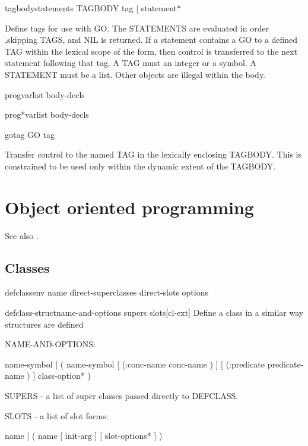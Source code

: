 \documentclass[10pt,english]{book}
\begin{document}
\begin{specialop}{tagbody}{\rest statements}
  TAGBODY {tag | statement}*

Define tags for use with GO. The STATEMENTS are evaluated in order ,skipping
TAGS, and NIL is returned. If a statement contains a GO to a defined TAG
within the lexical scope of the form, then control is transferred to the next
statement following that tag. A TAG must an integer or a symbol. A STATEMENT
must be a list. Other objects are illegal within the body.
\end{specialop}

\begin{macro}{prog}{varlist \body body-decls}
  
\end{macro}

\begin{macro}{prog*}{varlist \body body-decls}
  
\end{macro}

\begin{specialop}{go}{tag}
  GO tag

Transfer control to the named TAG in the lexically enclosing TAGBODY. This is
constrained to be used only within the dynamic extent of the TAGBODY.
\end{specialop}

\chapter{Object oriented programming}
\label{cha:object-orient-progr}

See also .

\section{Classes}
\label{sec:classes}

\begin{macro}{defclass}{\env env name direct-superclasses direct-slots \rest options}
  
\end{macro}

\begin{macro}{defclass-struct}{name-and-options supers \rest slots}[cl-ext]
  Define a class in a similar way structures are defined

NAME-AND-OPTIONS:

  name-symbol |
  ( name-symbol [ (:conc-name conc-name ) ]
                [ (:predicate predicate-name ) ]
                class-option* )

SUPERS - a list of super classes passed directly to DEFCLASS.

SLOTS - a list of slot forms:

  name |
  ( name [ init-arg ] [ slot-options* ] )
\end{macro}
\end{document}
